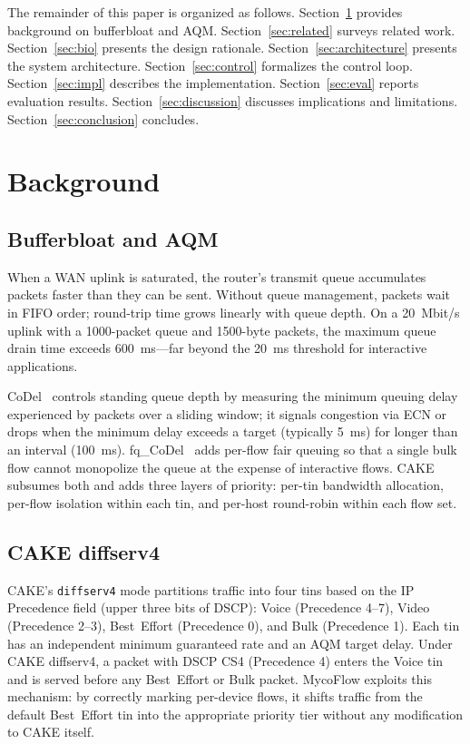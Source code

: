 \documentclass[conference]{IEEEtran}
\begin{document}
The remainder of this paper is organized as follows.
Section~\ref{sec:background} provides background on bufferbloat and AQM.
Section~\ref{sec:related} surveys related work.
Section~\ref{sec:bio} presents the design rationale.
Section~\ref{sec:architecture} presents the system architecture.
Section~\ref{sec:control} formalizes the control loop.
Section~\ref{sec:impl} describes the implementation.
Section~\ref{sec:eval} reports evaluation results.
Section~\ref{sec:discussion} discusses implications and limitations.
Section~\ref{sec:conclusion} concludes.

\section{Background}
\label{sec:background}

\subsection{Bufferbloat and AQM}

When a WAN uplink is saturated, the router's transmit queue accumulates
packets faster than they can be sent.
Without queue management, packets wait in FIFO order; round-trip time grows
linearly with queue depth.
On a 20~Mbit/s uplink with a 1000-packet queue and 1500-byte packets, the
maximum queue drain time exceeds 600~ms—far beyond the 20~ms threshold for
interactive applications.

CoDel~\cite{nichols2012} controls standing queue depth by measuring the
minimum queuing delay experienced by packets over a sliding window;
it signals congestion via ECN or drops when the minimum delay exceeds
a target (typically 5~ms) for longer than an interval (100~ms).
fq\_CoDel~\cite{hoeiland2018} adds per-flow fair queuing so that a single
bulk flow cannot monopolize the queue at the expense of interactive flows.
CAKE~\cite{cake2018} subsumes both and adds three layers of priority:
per-tin bandwidth allocation, per-flow isolation within each tin, and
per-host round-robin within each flow set.

\subsection{CAKE diffserv4}

CAKE's \texttt{diffserv4} mode partitions traffic into four tins based on
the IP Precedence field (upper three bits of DSCP):
Voice (Precedence 4--7), Video (Precedence 2--3), Best~Effort (Precedence 0),
and Bulk (Precedence 1).
Each tin has an independent minimum guaranteed rate and an AQM target delay.
Under CAKE diffserv4, a packet with DSCP CS4 (Precedence 4) enters the Voice
tin and is served before any Best~Effort or Bulk packet.
MycoFlow exploits this mechanism: by correctly marking per-device flows,
it shifts traffic from the default Best~Effort tin into the appropriate
priority tier without any modification to CAKE itself.
\end{document}
